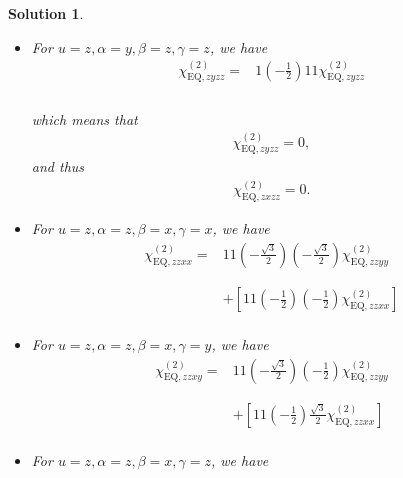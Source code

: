 \documentclass[UTF8,10pt,a4paper]{article}
\theoremstyle{Problem}
\theoremstyle{Solution}
\newtheorem*{sol}{Solution}
\begin{document}
\begin{sol}
\begin{itemize}
\begin{align}
\nonumber\chi_{\text{EQ},zyzy}^{(2)}=&1\left(-\frac{1}{2}\right)1\left(-\frac{1}{2}\right)\chi_{\text{EQ},zyzy}^{(2)}\\
\nonumber&\\
\nonumber&\\
\nonumber&+\left[1\frac{\sqrt{3}}{2}1\frac{\sqrt{3}}{2}\chi_{\text{EQ},zxzx}^{(2)}\right]\\
&
\end{align}\normalsize
\item For $u=z,\alpha=y,\beta=z,\gamma=z$, we have
\footnotesize\begin{align}
\nonumber\chi_{\text{EQ},zyzz}^{(2)}=&1\left(-\frac{1}{2}\right)11\chi_{\text{EQ},zyzz}^{(2)}\\
\nonumber&\\
\nonumber&\\
\nonumber&\\
&
\end{align}\normalsize
which means that
\begin{align}
    \chi_{\text{EQ},zyzz}^{(2)}=0,
\end{align}
and thus
\begin{align}
    \chi_{\text{EQ},zxzz}^{(2)}=0.
\end{align}
\item For $u=z,\alpha=z,\beta=x,\gamma=x$, we have
\footnotesize\begin{align}
\nonumber\chi_{\text{EQ},zzxx}^{(2)}=&11\left(-\frac{\sqrt{3}}{2}\right)\left(-\frac{\sqrt{3}}{2}\right)\chi_{\text{EQ},zzyy}^{(2)}\\
\nonumber&\\
\nonumber&\\
\nonumber&+\left[11\left(-\frac{1}{2}\right)\left(-\frac{1}{2}\right)\chi_{\text{EQ},zzxx}^{(2)}\right]\\
&
\end{align}\normalsize
\item For $u=z,\alpha=z,\beta=x,\gamma=y$, we have
\footnotesize\begin{align}
\nonumber\chi_{\text{EQ},zzxy}^{(2)}=&11\left(-\frac{\sqrt{3}}{2}\right)\left(-\frac{1}{2}\right)\chi_{\text{EQ},zzyy}^{(2)}\\
\nonumber&\\
\nonumber&\\
\nonumber&+\left[11\left(-\frac{1}{2}\right)\frac{\sqrt{3}}{2}\chi_{\text{EQ},zzxx}^{(2)}\right]\\
&
\end{align}\normalsize
\item For $u=z,\alpha=z,\beta=x,\gamma=z$, we have

\end{itemize}
\end{sol}
\end{document}
